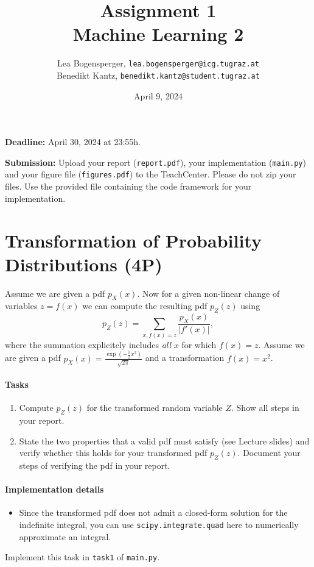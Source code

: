 \documentclass{article}
\title{{\Huge \textbf{Assignment 1}} \\ {\Large \textbf{Machine Learning 2}}}
\author{Lea Bogensperger, \texttt{lea.bogensperger@icg.tugraz.at}\vspace{-0.4cm} \\ Benedikt Kantz, \texttt{benedikt.kantz@student.tugraz.at}}
\date{April 9, 2024}
\newcommand{\deadline}{\noindent\textbf{Deadline:}\xspace}
\newcommand{\submission}{\noindent\textbf{Submission:}\xspace}
\begin{document}
\maketitle

\vspace{0.5cm}
\deadline
April 30, 2024 at 23:55h.

\submission 
Upload your report (\texttt{report.pdf}), your implementation (\texttt{main.py}) and your figure file (\texttt{figures.pdf}) to the TeachCenter. Please do not zip your files. Use the provided file containing the code framework for your implementation.

\section{Transformation of Probability Distributions (4P)}
Assume we are given a \gls{pdf} $p_X(x)$. Now for a given non-linear change of variables $z=f(x)$ we can compute the resulting \gls{pdf} $p_Z(z)$ using
\[
p_Z(z) = \sum_{x,f(x)=z} \frac{p_X(x)}{|f'(x)|},
\]
where the summation explicitely includes \textit{all} $x$ for which $f(x)=z$. 
Assume we are given a \gls{pdf} $p_X(x)=\frac{\exp(-\frac 12 x^2)}{\sqrt{2\pi}}$ and a transformation $f(x)=x^2$.
\paragraph{Tasks}
\begin{enumerate}
	\item Compute $p_Z(z)$ for the transformed random variable $Z$. Show all steps in your report.
	\item State the two properties that a valid \gls{pdf} must satisfy (see Lecture slides) and verify whether this holds for your transformed \gls{pdf} $p_Z(z)$. Document your steps of verifying the \gls{pdf} in your report. 
\end{enumerate}

\paragraph{Implementation details}
\begin{itemize}
	\item Since the transformed \gls{pdf} does not admit a closed-form solution for the indefinite integral, you can use  \texttt{scipy.integrate.quad} here to numerically approximate an integral.
\end{itemize}
Implement this task in \texttt{task1} of \texttt{main.py}.
\end{document}
